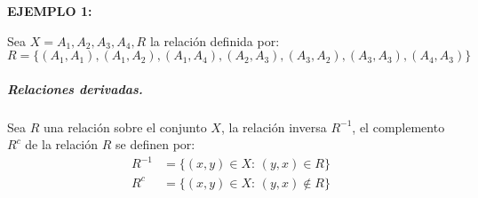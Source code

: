 \documentclass[a5paper,doc,10pt,noapacite]{apa6}
\begin{document}
{{%
\vspace{1\baselineskip}
\textbf{EJEMPLO 1:}

Sea \(X = {A_1, A_2, A_3, A_4}, R\) la relación definida por:
\[
	R = \big\{		(A_1, A_1),(A_1, A_2),(A_1, A_4),(A_2, A_3),(A_3,A_2),(A_3, A_3),(A_4,A_3) \big\}
\]

\begin{figure}
\begin{floatrow}
	\fontsize{7}{11}\selectfont
	\captionsetup{justification=centering, labelfont=footnotesize, font=footnotesize}
\end{floatrow}
\end{figure}
%


\subparagraph{Relaciones derivadas.}

Sea \(R\) una relación sobre el conjunto \(X\), la relación inversa \(R^{-1}\), el complemento \(R^{c}\) de la relación \(R\) se definen por:
\begin{align*}
    R^{-1} &= \big\{(x,y) \in X : \,(y,x) \in R \big\} \\
    R^{c} &= \big\{(x,y) \in X : \, (y,x) \not \in R\big\} 
\end{align*}

}}
\end{document}
